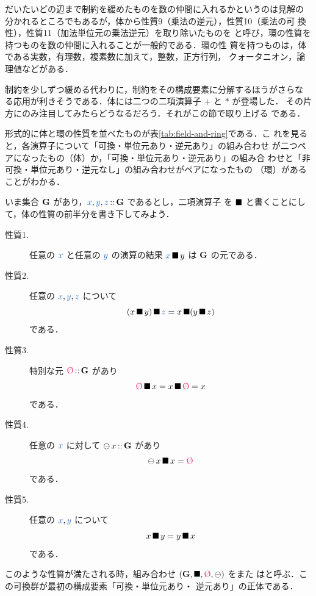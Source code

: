 \documentclass[a5paper,twoside,fleqn,draft]{jsbook}
\begin{document}
だいたいどの辺まで制約を緩めたものを数の仲間に入れるかというのは見解の
分かれるところでもあるが，体から性質9（乗法の逆元），性質10（乗法の可
換性），性質11（加法単位元の乗法逆元）を取り除いたものを
と呼び，環の性質を持つものを数の仲間に入れることが一般的である．環の性
質を持つものは，体である実数，有理数，複素数に加えて，整数，正方行列，
クォータニオン，論理値などがある．

制約を少しずつ緩める代わりに，制約をその構成要素に分解するほうがさらな
る応用が利きそうである．体には二つの二項演算子 $+$ と $*$ が登場した．
その片方にのみ注目してみたらどうなるだろう．それがこの節で取り上げる
である．

形式的に体と環の性質を並べたものが表\ref{tab:field-and-ring}である．こ
れを見ると，各演算子について「可換・単位元あり・逆元あり」の組み合わせ
が二つペアになったもの（体）か，「可換・単位元あり・逆元あり」の組み合
わせと「非可換・単位元あり・逆元なし」の組み合わせがペアになったもの
（環）があることがわかる．

いま集合 $\mathbf{G}$ があり，$\hVar{x},\hVar{y},\hVar{z}\hIsTypeOf\mSet{G}$ であるとし，二項演算子
を $\operatorname{\blacksquare}$ と書くことにして，体の性質の前半分を書き下してみよう．
\begin{description}
\item[性質1.] 任意の $\hVar{x}$ と任意の $\hVar{y}$ の演算の結果 $\hVar{x}\hAnyBinOp y$ は
$\mathbf{G}$ の元である．
\item[性質2.] 任意の $\hVar{x},\hVar{y},\hVar{z}$ について
\begin{equation}
(x\hAnyBinOp y)\hAnyBinOp \hVar{z}=x\hAnyBinOp(y\hAnyBinOp z)
\end{equation}
である．
\item[性質3.] 特別な元 $\mZero\hIsTypeOf\mSet{G}$ があり
\begin{equation}
\mZero\hAnyBinOp x=x\hAnyBinOp\mZero=x
\end{equation}
である．
\item[性質4.] 任意の $\hVar{x}$ に対して $\operatorname{\ominus} x\operatorname{:\!:}\mathbf{G}$ があり
\begin{equation}
\mMinus x\hAnyBinOp x=\mZero
\end{equation}
である．
\item[性質5.] 任意の $\hVar{x},\hVar{y}$ について
\begin{equation}
x\operatorname{\blacksquare} y=y\operatorname{\blacksquare} x
\end{equation}
である．
\end{description}
このような性質が満たされる時，組み合わせ
$\hSingleTuppleWith{\mSet{G},\hAnyBinOp,\mZero,\mMinus}$ をまた
はと呼ぶ．この可換群が最初の構成要素「可換・単位元あり・
逆元あり」の正体である．
\end{document}
